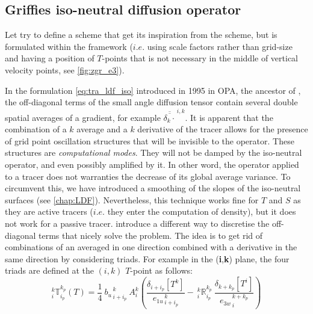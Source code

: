 \documentclass[../tex_main/NEMO_manual]{subfiles}
\begin{document}
\subsection{Griffies iso-neutral diffusion operator}

Let try to define a scheme that get its inspiration from the \citet{Griffies_al_JPO98}
scheme, but is formulated within the \NEMO framework ($i.e.$ using scale 
factors rather than grid-size and having a position of $T$-points that is not 
necessary in the middle of vertical velocity points, see \autoref{fig:zgr_e3}).

In the formulation \autoref{eq:tra_ldf_iso} introduced in 1995 in OPA, the ancestor of \NEMO, 
the off-diagonal terms of the small angle diffusion tensor contain several double 
spatial averages of a gradient, for example $\overline{\overline{\delta_k \cdot}}^{\,i,k}$. 
It is apparent that the combination of a $k$ average and a $k$ derivative of the tracer 
allows for the presence of grid point oscillation structures that will be invisible 
to the operator. These structures are \textit{computational modes}. They
will not be damped by the iso-neutral operator, and even possibly amplified by it. 
In other word, the operator applied to a tracer does not warranties the decrease of 
its global average variance. To circumvent this, we have introduced a smoothing of 
the slopes of the iso-neutral surfaces (see \autoref{chap:LDF}). Nevertheless, this technique 
works fine for $T$ and $S$ as they are active tracers ($i.e.$ they enter the computation 
of density), but it does not work for a passive tracer.   \citep{Griffies_al_JPO98} introduce 
a different way to discretise the off-diagonal terms that nicely solve the problem. 
The idea is to get rid of combinations of an averaged in one direction combined 
with a derivative in the same direction by considering triads. For example in the 
(\textbf{i},\textbf{k}) plane, the four triads are defined at the $(i,k)$ $T$-point as follows:
\begin{equation} \label{eq:Gf_triads}
_i^k \mathbb{T}_{i_p}^{k_p} (T)
= \frac{1}{4} \ {b_u}_{\,i+i_p}^{\,k}  \  A_i^k  	\left(  
                                                     \frac{ \delta_{i + i_p}[T^k] }{ {e_{1u}}_{\,i + i_p}^{\,k} } 
-\ {_i^k \mathbb{R}_{i_p}^{k_p}} \ \frac{ \delta_{k+k_p} [T^i] }{ {e_{3w}}_{\,i}^{\,k+k_p} } 
									  \right)
\end{equation}
\end{document}
